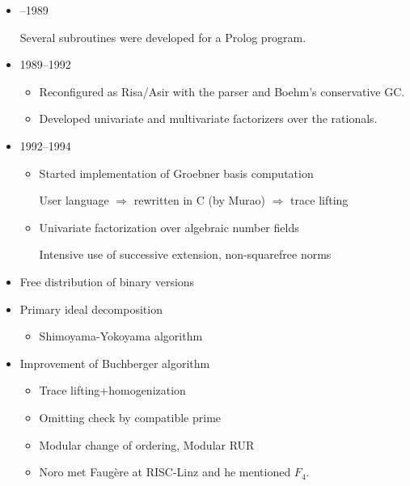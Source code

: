 \begin{slide}{}

\begin{itemize}
\item --1989

Several subroutines were developed for a Prolog program.

\item 1989--1992

\begin{itemize}
\item Reconfigured as Risa/Asir with the parser and Boehm's conservative GC.

\item Developed univariate and multivariate factorizers over the rationals.
\end{itemize}

\item 1992--1994

\begin{itemize}
\item Started implementation of Groebner basis computation

User language $\Rightarrow$ rewritten in C (by Murao) $\Rightarrow$
trace lifting

\item Univariate factorization over algebraic number fields

Intensive use of successive extension, non-squarefree norms
\end{itemize}
\end{itemize}

\end{slide}

\begin{slide}{}

\begin{itemize}
\item Free distribution of binary versions

\item Primary ideal decomposition

\begin{itemize}
\item Shimoyama-Yokoyama algorithm
\end{itemize}

\item Improvement of Buchberger algorithm

\begin{itemize}
\item Trace lifting+homogenization

\item Omitting check by compatible prime

\item Modular change of ordering, Modular RUR

\item Noro met Faug\`ere at RISC-Linz and he mentioned $F_4$.
\end{itemize}
\end{itemize}

\end{slide}

